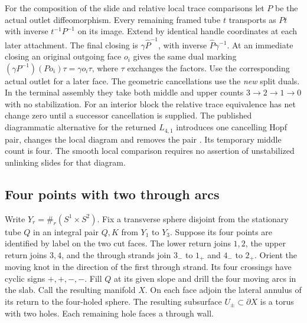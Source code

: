 \documentclass[11pt,letterpaper]{article}
\numberwithin{equation}{section}
\theoremstyle{remark}
\begin{document}
For the composition of the slide and relative local trace
comparisons let \(P\) be the actual outlet diffeomorphism. Every
remaining framed tube \(t\) transports as \(Pt\) with inverse
\(t^{-1}P^{-1}\) on its image. Extend by identical handle coordinates
at each later attachment. The final closing is
\(\gamma\widehat P^{-1}\), with inverse \(\widehat P\gamma^{-1}\).
At an immediate closing an original outgoing face \(o_i\) gives the
same dual marking \((\gamma P^{-1})(P o_i)\tau=\gamma o_i\tau\),
where \(\tau\) exchanges the factors. Use the corresponding actual
outlet for a later face. The geometric cancellations use the
\emph{new} split duals. In the terminal assembly they take both
middle and upper counts \(3\to2\to1\to0\) with no stabilization.
For an interior block the relative trace equivalence has net change
zero until a successor cancellation is supplied. The published
diagrammatic alternative for the returned \(L_{4,1}\) introduces
one cancelling Hopf pair, changes the local diagram and removes the
pair \cite[\S10]{GompfScharlemannThompson2010}. Its temporary middle
count is four. The smooth local comparison requires no assertion of
unstabilized unlinking slides for that diagram.

\subsection{Four points with two through arcs}\label{sec:four-port}
Write \(Y_r=\#_r(S^1\times S^2)\). Fix a transverse sphere disjoint
from the stationary tube \(Q\) in an integral pair \(Q,K\) from
\(Y_1\) to \(Y_3\). Suppose its four points are identified by label
on the two cut faces. The lower return joins \(1,2\), the upper return
joins \(3,4\), and the through strands join \(3_-\) to \(1_+\)
and \(4_-\) to \(2_+\). Orient the moving knot in the direction of
the first through strand. Its four crossings have cyclic signs
\(+,+,-,-\). Fill \(Q\) at its given slope and drill the four moving
arcs in the slab. Call the resulting manifold \(X\). On each face
adjoin the lateral annulus of its return to the four-holed sphere.
The resulting subsurface \(U_\pm\subset\partial X\) is a torus with
two holes. Each remaining hole faces a through wall.
\end{document}

